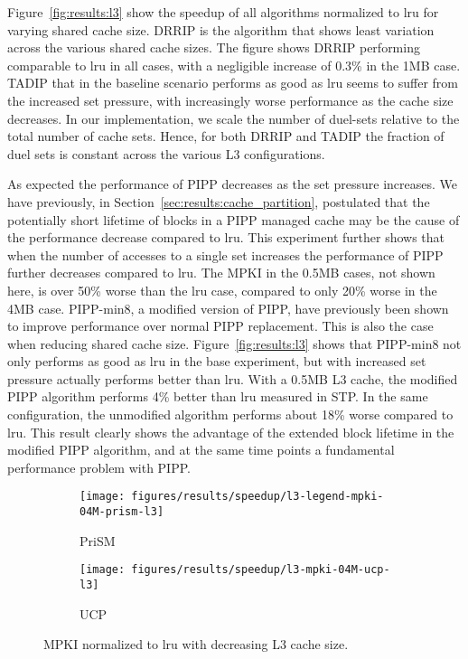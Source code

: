 Figure~\ref{fig:results:l3} show the speedup of all algorithms normalized to \gls{lru} for varying shared cache size.
DRRIP is the algorithm that shows least variation across the various shared cache sizes.
The figure shows DRRIP performing comparable to \gls{lru} in all cases, with a negligible increase of 0.3\% in the 1MB case.
TADIP that in the baseline scenario performs as good as \gls{lru} seems to suffer from the increased set pressure, with increasingly worse performance as the cache size decreases.
In our implementation, we scale the number of duel-sets relative to the total number of cache sets.
Hence, for both DRRIP and TADIP the fraction of duel sets is constant across the various L3 configurations.

As expected the performance of PIPP decreases as the set pressure increases.
We have previously, in Section~\ref{sec:results:cache_partition}, postulated that the potentially short lifetime of blocks in a PIPP managed cache may be the cause of the performance decrease compared to \gls{lru}.
This experiment further shows that when the number of accesses to a single set increases the performance of PIPP further decreases compared to \gls{lru}.
The MPKI in the 0.5MB cases, not shown here, is over 50\% worse than the \gls{lru} case, compared to only 20\% worse in the 4MB case.
PIPP-min8, a modified version of PIPP, have previously been shown to improve performance over normal PIPP replacement.
This is also the case when reducing shared cache size.
Figure~\ref{fig:results:l3} shows that PIPP-min8 not only performs as good as \gls{lru} in the base experiment, but with increased set pressure actually performs better than \gls{lru}.
With a 0.5MB L3 cache, the modified PIPP algorithm performs 4\% better than \gls{lru} measured in STP.
In the same configuration, the unmodified algorithm performs about 18\% worse compared to \gls{lru}.
This result clearly shows the advantage of the extended block lifetime in the modified PIPP algorithm, and at the same time points a fundamental performance problem with PIPP.


\begin{figure}[t]
    \centering
    \begin{subfigure}[b]{0.5\textwidth}
        \centering
        \texttt{[image: figures/results/speedup/l3-legend-mpki-04M-prism-l3]}
        \caption{PriSM}
        \label{fig:results:l3:mpki-prism}
    \end{subfigure}%
    \begin{subfigure}[b]{0.5\textwidth}
        \centering
        \texttt{[image: figures/results/speedup/l3-mpki-04M-ucp-l3]}
        \caption{UCP}
        \label{fig:results:l3:mpki-ucp}
    \end{subfigure}
    \label{fig:results:l3:mpki}
    \caption{MPKI normalized to \gls{lru} with decreasing L3 cache size.}
\end{figure}

